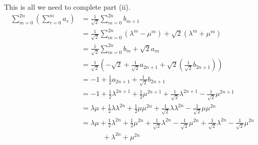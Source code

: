 \documentclass[12pt]{article}
\begin{document}
This is all we need to complete part (ii).
\begin{align*}
    \sum_{m=0}^{2n} \left(\sum_{r=0}^{m} a_r\right) & = \frac{1}{\sqrt{2}} \sum_{m=0}^{2n} b_{m+1}                                                                                                                                                   \\
                                                    & = \frac{1}{\sqrt{2}} \sum_{m=0}^{2n} (\lambda^m - \mu^m) + \sqrt{2} (\lambda^m + \mu^m)                                                                                                        \\
                                                    & = \frac{1}{\sqrt{2}} \sum_{m=0}^{2n} b_m + \sqrt{2} a_m                                                                                                                                        \\
                                                    & = \frac{1}{\sqrt{2}} \left( -\sqrt{2} + \frac{1}{\sqrt{2}} a_{2n+1} + \sqrt{2} \left(\frac{1}{\sqrt{2}} b_{2n+1} \right) \right)                                                               \\
                                                    & = -1 + \frac{1}{2} a_{2n+1} + \frac{1}{\sqrt{2}} b_{2n+1}                                                                                                                                      \\
                                                    & = -1 + \frac{1}{2} \lambda^{2n+1} + \frac{1}{2} \mu^{2n+1} + \frac{1}{\sqrt{2}} \lambda^{2n+1} - \frac{1}{\sqrt{2}} \mu^{2n+1}                                                                 \\
                                                    & = \lambda\mu + \frac{1}{2} \lambda\lambda^{2n} + \frac{1}{2} \mu\mu^{2n} + \frac{1}{\sqrt{2}} \lambda\lambda^{2n} - \frac{1}{\sqrt{2}} \mu\mu^{2n}                                             \\
                                                    & = \lambda\mu + \frac{1}{2} \lambda^{2n} + \frac{1}{2} \mu^{2n} + \frac{1}{\sqrt{2}} \lambda^{2n} - \frac{1}{\sqrt{2}} \mu^{2n} + \frac{1}{\sqrt{2}} \lambda^{2n} - \frac{1}{\sqrt{2}} \mu^{2n} \\
                                                    & \phantom{++}\quad + \lambda^{2n} + \mu^{2n}                                                                                                                                                    \\

\end{align*}
\end{document}
